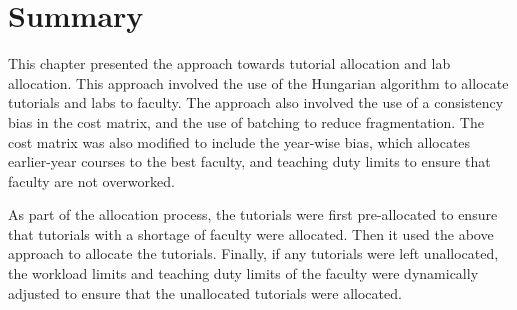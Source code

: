 \begin{table}[H]
  \centering
  \caption{Impact of Dynamic Adjustment of Limits on Labs}
  \label{tab:dynamic_adjustment_labs}
\end{table}

\section{Summary}

This chapter presented the approach towards tutorial allocation and lab allocation. This approach involved the use of the Hungarian algorithm to allocate tutorials and labs to faculty. The approach also involved the use of a consistency bias in the cost matrix, and the use of batching to reduce fragmentation. The cost matrix was also modified to include the year-wise bias, which allocates earlier-year courses to the best faculty, and teaching duty limits to ensure that faculty are not overworked.

As part of the allocation process, the tutorials were first pre-allocated to ensure that tutorials with a shortage of faculty were allocated. Then it used the above approach to allocate the tutorials. Finally, if any tutorials were left unallocated, the workload limits and teaching duty limits of the faculty were dynamically adjusted to ensure that the unallocated tutorials were allocated.

